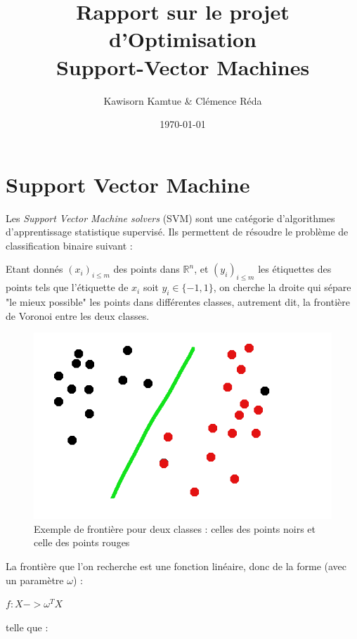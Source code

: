 \documentclass{article}
\title{Rapport sur le projet d'Optimisation\\Support-Vector Machines}
\author{Kawisorn Kamtue \& Clémence Réda}
\date{\today}
\begin{document}
\section{Support Vector Machine}

Les \emph{Support Vector Machine solvers} (SVM) sont une catégorie d'algorithmes d'apprentissage statistique supervisé. Ils permettent de résoudre le problème de classification binaire suivant :\\

           \begin{center}
           Etant donnés $(x_i)_{i \leq m}$ des points dans $\mathbb{R}^n$, et $(y_i)_{i \leq m}$ les étiquettes des points tels que l'étiquette de $x_i$ soit $y_i \in \{-1, 1\}$, on cherche la droite qui sépare "le mieux possible" les points dans différentes classes, autrement dit, la frontière de Voronoi entre les deux classes.
           \begin{figure}[H]
           \centering
           \caption{Exemple de frontière pour deux classes : celles des points noirs et celle des points rouges}
           \includegraphics[scale=0.3]{images/voronoi.png}
           \end{figure}
           \end{center} 

La frontière que l'on recherche est une fonction linéaire, donc de la forme (avec un paramètre $\omega$) :\\

          \begin{center}
          $f : X -> \omega^{T}X$
          \end{center}

telle que :\\
 
\end{document}
